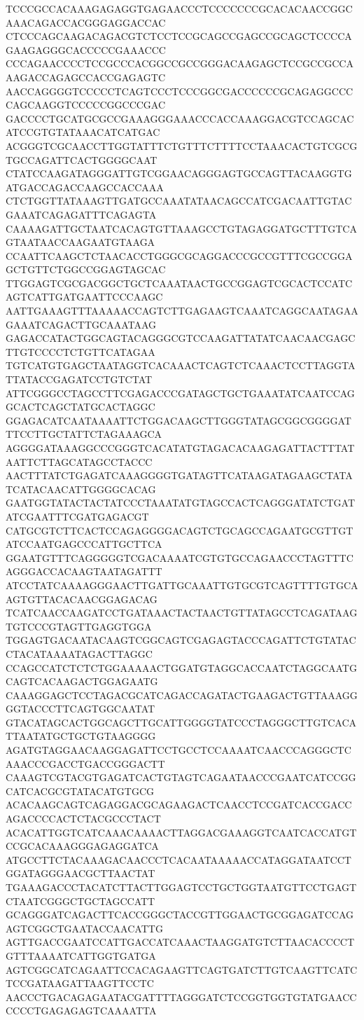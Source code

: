 TCCCGCCACAAAGAGAGGTGAGAACCCTCCCCCCCGCACACAACCGGCAAACAGACCACGGGAGGACCAC
CTCCCAGCAAGACAGACGTCTCCTCCGCAGCCGAGCCGCAGCTCCCCAGAAGAGGGCACCCCCGAAACCC
CCCAGAACCCCTCCGCCCACGGCCGCCGGGACAAGAGCTCCGCCGCCAAAGACCAGAGCCACCGAGAGTC
AACCAGGGGTCCCCCTCAGTCCCTCCCGGCGACCCCCCGCAGAGGCCCCAGCAAGGTCCCCCGGCCCGAC
GACCCCTGCATGCGCCGAAAGGGAAACCCACCAAAGGACGTCCAGCACATCCGTGTATAAACATCATGAC
ACGGGTCGCAACCTTGGTATTTCTGTTTCTTTTCCTAAACACTGTCGCGTGCCAGATTCACTGGGGCAAT
CTATCCAAGATAGGGATTGTCGGAACAGGGAGTGCCAGTTACAAGGTGATGACCAGACCAAGCCACCAAA
CTCTGGTTATAAAGTTGATGCCAAATATAACAGCCATCGACAATTGTACGAAATCAGAGATTTCAGAGTA
CAAAAGATTGCTAATCACAGTGTTAAAGCCTGTAGAGGATGCTTTGTCAGTAATAACCAAGAATGTAAGA
CCAATTCAAGCTCTAACACCTGGGCGCAGGACCCGCCGTTTCGCCGGAGCTGTTCTGGCCGGAGTAGCAC
TTGGAGTCGCGACGGCTGCTCAAATAACTGCCGGAGTCGCACTCCATCAGTCATTGATGAATTCCCAAGC
AATTGAAAGTTTAAAAACCAGTCTTGAGAAGTCAAATCAGGCAATAGAAGAAATCAGACTTGCAAATAAG
GAGACCATACTGGCAGTACAGGGCGTCCAAGATTATATCAACAACGAGCTTGTCCCCTCTGTTCATAGAA
TGTCATGTGAGCTAATAGGTCACAAACTCAGTCTCAAACTCCTTAGGTATTATACCGAGATCCTGTCTAT
ATTCGGGCCTAGCCTTCGAGACCCGATAGCTGCTGAAATATCAATCCAGGCACTCAGCTATGCACTAGGC
GGAGACATCAATAAAATTCTGGACAAGCTTGGGTATAGCGGCGGGGATTTCCTTGCTATTCTAGAAAGCA
AGGGGATAAAGGCCCGGGTCACATATGTAGACACAAGAGATTACTTTATAATTCTTAGCATAGCCTACCC
AACTTTATCTGAGATCAAAGGGGTGATAGTTCATAAGATAGAAGCTATATCATACAACATTGGGGCACAG
GAATGGTATACTACTATCCCTAAATATGTAGCCACTCAGGGATATCTGATATCGAATTTCGATGAGACGT
CATGCGTCTTCACTCCAGAGGGGACAGTCTGCAGCCAGAATGCGTTGTATCCAATGAGCCCATTGCTTCA
GGAATGTTTCAGGGGGTCGACAAAATCGTGTGCCAGAACCCTAGTTTCAGGGACCACAAGTAATAGATTT
ATCCTATCAAAAGGGAACTTGATTGCAAATTGTGCGTCAGTTTTGTGCAAGTGTTACACAACGGAGACAG
TCATCAACCAAGATCCTGATAAACTACTAACTGTTATAGCCTCAGATAAGTGTCCCGTAGTTGAGGTGGA
TGGAGTGACAATACAAGTCGGCAGTCGAGAGTACCCAGATTCTGTATACCTACATAAAATAGACTTAGGC
CCAGCCATCTCTCTGGAAAAACTGGATGTAGGCACCAATCTAGGCAATGCAGTCACAAGACTGGAGAATG
CAAAGGAGCTCCTAGACGCATCAGACCAGATACTGAAGACTGTTAAAGGGGTACCCTTCAGTGGCAATAT
GTACATAGCACTGGCAGCTTGCATTGGGGTATCCCTAGGGCTTGTCACATTAATATGCTGCTGTAAGGGG
AGATGTAGGAACAAGGAGATTCCTGCCTCCAAAATCAACCCAGGGCTCAAACCCGACCTGACCGGGACTT
CAAAGTCGTACGTGAGATCACTGTAGTCAGAATAACCCGAATCATCCGGCATCACGCGTATACATGTGCG
ACACAAGCAGTCAGAGGACGCAGAAGACTCAACCTCCGATCACCGACCAGACCCCACTCTACGCCCTACT
ACACATTGGTCATCAAACAAAACTTAGGACGAAAGGTCAATCACCATGTCCGCACAAAGGGAGAGGATCA
ATGCCTTCTACAAAGACAACCCTCACAATAAAAACCATAGGATAATCCTGGATAGGGAACGCTTAACTAT
TGAAAGACCCTACATCTTACTTGGAGTCCTGCTGGTAATGTTCCTGAGTCTAATCGGGCTGCTAGCCATT
GCAGGGATCAGACTTCACCGGGCTACCGTTGGAACTGCGGAGATCCAGAGTCGGCTGAATACCAACATTG
AGTTGACCGAATCCATTGACCATCAAACTAAGGATGTCTTAACACCCCTGTTTAAAATCATTGGTGATGA
AGTCGGCATCAGAATTCCACAGAAGTTCAGTGATCTTGTCAAGTTCATCTCCGATAAGATTAAGTTCCTC
AACCCTGACAGAGAATACGATTTTAGGGATCTCCGGTGGTGTATGAACCCCCCTGAGAGAGTCAAAATTA
